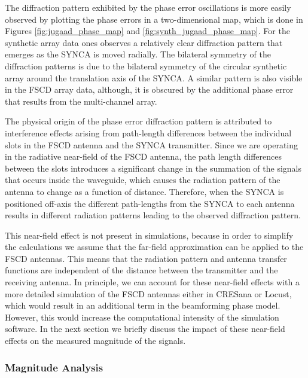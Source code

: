 The diffraction pattern exhibited by the phase error oscillations is more easily observed by plotting the phase errors in a two-dimensional map, which is done in Figures \ref{fig:jugaad_phase_map} and \ref{fig:synth_jugaad_phase_map}. For the synthetic array data ones observes a relatively clear diffraction pattern that emerges as the SYNCA is moved radially. The bilateral symmetry of the diffraction patterns is due to the bilateral symmetry of the circular synthetic array around the translation axis of the SYNCA. A similar pattern is also visible in the FSCD array data, although, it is obscured by the additional phase error that results from the multi-channel array.

The physical origin of the phase error diffraction pattern is attributed to interference effects arising from path-length differences between the individual slots in the FSCD antenna and the SYNCA transmitter. Since we are operating in the radiative near-field of the FSCD antenna, the path length differences between the slots introduces a significant change in the summation of the signals that occurs inside the waveguide, which causes the radiation pattern of the antenna to change as a function of distance. Therefore, when the SYNCA is positioned off-axis the different path-lengths from the SYNCA to each antenna results in different radiation patterns leading to the observed diffraction pattern. 

This near-field effect is not present in simulations, because in order to simplify the calculations we assume that the far-field approximation can be applied to the FSCD antennas. This means that the radiation pattern and antenna transfer functions are independent of the distance between the transmitter and the receiving antenna. In principle, we can account for these near-field effects with a more detailed simulation of the FSCD antennas either in CRESana or Locust, which would result in an additional term in the beamforming phase model. However, this would increase the computational intensity of the simulation software. In the next section we briefly discuss the impact of these near-field effects on the measured magnitude of the signals.

\subsubsection{Magnitude Analysis}


